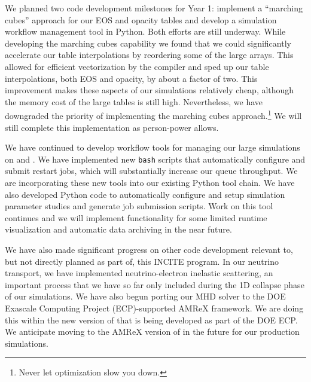 \documentclass[12pt]{article}
\begin{document}
We planned two code development milestones for Year 1: implement a ``marching cubes'' approach for our EOS and opacity tables and develop a simulation workflow management tool in Python.
Both efforts are still underway.
While developing the marching cubes capability we found that we could significantly accelerate our table interpolations by reordering some of the large arrays.
This allowed for efficient vectorization by the compiler and sped up our table interpolations, both EOS and opacity, by about a factor of two. 
This improvement makes these aspects of our simulations relatively cheap, although the memory cost of the large tables is still high.
Nevertheless, we have downgraded the priority of implementing the marching cubes approach.\footnote{Never let optimization slow you down.}
We will still complete this implementation as person-power allows.

We have continued to develop workflow  tools for managing our large simulations on \mira and \thet. 
We have implemented new {\tt bash} scripts that automatically configure and submit restart jobs, which will substantially increase our queue throughput. 
We are incorporating these new tools into our existing Python tool chain.
We have also developed Python code to automatically configure and setup simulation parameter studies and generate job submission scripts. 
Work on this tool continues and we will implement functionality for some limited runtime visualization and automatic data archiving in the near future.

We have also made significant progress on other code development relevant to, but not directly planned as part of, this INCITE program. 
In our neutrino transport, we have implemented neutrino-electron inelastic scattering, an important process that we have so far only included during the 1D collapse phase of our simulations. 
We have also begun porting our \spark MHD solver to the DOE Exascale Computing Project (ECP)-supported AMReX framework. 
We are doing this within the new version of \flash that is being developed as part of the DOE ECP. 
We anticipate moving to the AMReX version of \flash in the future for our production simulations.
\end{document}
